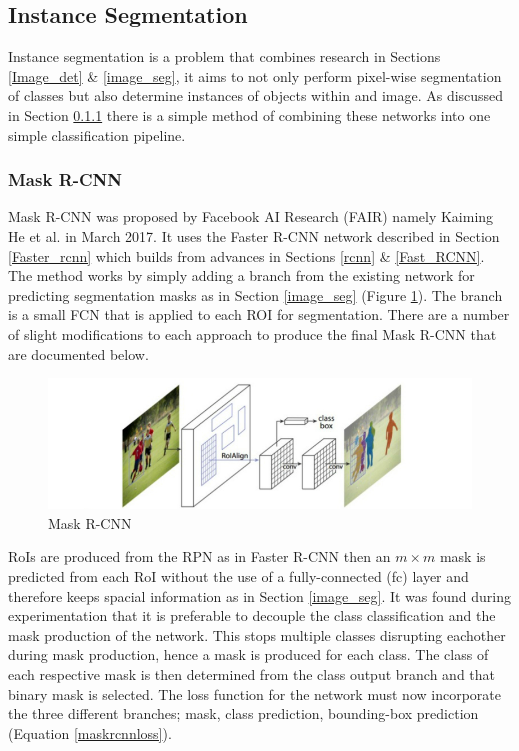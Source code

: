 \documentclass[11pt,twoside]{report}
\begin{document}
\subsection{Instance Segmentation}
Instance segmentation is a problem that combines research in Sections \ref{Image_det} \& \ref{image_seg}, it aims to not only perform pixel-wise segmentation of classes but also determine instances of objects within and image. As discussed in Section \ref{mask_rcnn} there is a simple method of combining these networks into one simple classification pipeline.
\subsubsection{Mask R-CNN} \label{mask_rcnn}
Mask R-CNN was proposed by Facebook AI Research (FAIR) namely Kaiming He et al. in March 2017. It uses the Faster R-CNN network described in Section \ref{Faster_rcnn} which builds from advances in Sections \ref{rcnn}  \& \ref{Fast_RCNN}. The method works by simply adding a branch from the existing network for predicting segmentation masks as in Section \ref{image_seg} (Figure \ref{Mask_rcnn_arch}). The branch is a small FCN that is applied to each ROI for segmentation. There are a number of slight modifications to each approach to produce the final Mask R-CNN that are documented below.
\newline \newline

\noindent \begin{figure}[h!]
	\includegraphics[width = 1.0\hsize]{./figures/mask_arch.jpg}
	\caption{Mask R-CNN \cite{DBLP:journals/corr/HeGDG17}}
	\label{Mask_rcnn_arch}
\end{figure}
RoIs are produced from the RPN as in Faster R-CNN \cite{DBLP:journals/corr/RenHG015} then an $m \times m$ mask is predicted from each RoI without the use of a fully-connected (fc) layer and therefore keeps spacial information as in Section \ref{image_seg}. It was found during experimentation that it is preferable to decouple the class classification and the mask production of the network. This stops multiple classes disrupting eachother during mask production, hence a mask is produced for each class. The class of each respective mask is then determined from the class output branch and that binary mask is selected. 
\newline \newline
The loss function for the network must now incorporate the three different branches; mask, class prediction, bounding-box prediction (Equation \ref{maskrcnnloss}). 
\end{document}
